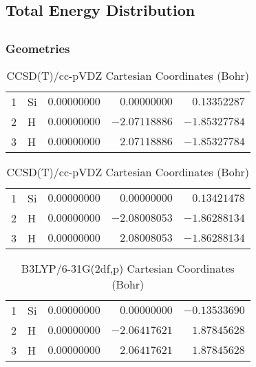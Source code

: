 \documentclass[10pt,oneside]{article}
\begin{document}
\begin{table}
\subsection*{Total Energy Distribution}
\centering\end{table}

\clearpage

\subsection{}

\begin{table}[h!]
\subsubsection*{Geometries}
\begin{multicols}{2}
\centering
\caption{CCSD(T)/cc-pVTZ Cartesian Coordinates (Bohr)}
\begin{tabular}{llrrr}
\toprule
1  & Si & $ 0.00000000$ & $ 0.00000000$ & $ 0.13352287$ \\
2  & H  & $ 0.00000000$ & $-2.07118886$ & $-1.85327784$ \\
3  & H  & $ 0.00000000$ & $ 2.07118886$ & $-1.85327784$ \\
\bottomrule
\end{tabular}
\caption{CCSD(T)/cc-pVDZ Cartesian Coordinates (Bohr)}
\begin{tabular}{llrrr}
\toprule
1  & Si & $ 0.00000000$ & $ 0.00000000$ & $ 0.13421478$ \\
2  & H  & $ 0.00000000$ & $-2.08008053$ & $-1.86288134$ \\
3  & H  & $ 0.00000000$ & $ 2.08008053$ & $-1.86288134$ \\
\bottomrule
\end{tabular}
\end{multicols}
\end{table}

\begin{table}[h]
\centering
\caption{B3LYP/6-31G(2df,p) Cartesian Coordinates (Bohr)}
\begin{tabular}{llrrr}
\toprule
1  & Si & $ 0.00000000$ & $ 0.00000000$ & $-0.13533690$ \\
2  & H  & $ 0.00000000$ & $-2.06417621$ & $ 1.87845628$ \\
3  & H  & $ 0.00000000$ & $ 2.06417621$ & $ 1.87845628$ \\
\bottomrule
\end{tabular}
\end{table}
\end{document}
